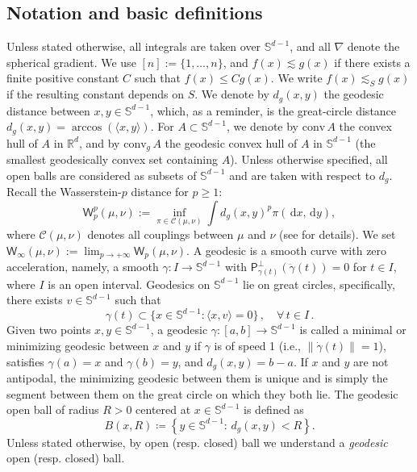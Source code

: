\documentclass[a4paper,11pt]{article}
\theoremstyle{plain}
\newcommand{\proj}{\bm{\mathsf{P}}^\perp}
\newcommand{\diff}{\, \mathrm{d}}
\newcommand{\conv}{\mathrm{conv}}
\renewcommand{\S}{\mathbb{S}^{d-1}}
\renewcommand{\leq}{\leqslant}
\renewcommand{\geq}{\geqslant}
\numberwithin{equation}{section}
\newcommand{\nbbg}[1]{ {\text{\bf bg:} \color{mygrey}{#1}} }
\newcommand{\npdr}[1]{ {\colorbox{MIT}{\color{white} \textsf{PR}} \color{MIT}{#1}} }
\begin{document}
\subsection{Notation and basic definitions} 
Unless stated otherwise, all integrals are taken over $\S$, and all $\nabla$ denote the spherical gradient. We use $[n]:=\{1,\ldots,n\}$, and $f(x) \lesssim g(x)$ if there exists a finite positive constant $C$ such that $f(x) \leq Cg(x)$. We write $f(x) \lesssim_S g(x)$ if the resulting constant depends on $S$. We denote by $d_g(x,y)$ the geodesic distance between $x, y \in \S$, which, as a reminder, is the great-circle distance $d_g(x,y) = \arccos(\langle x, y \rangle)$. For $A \subset \S$, we denote by $\mathrm{conv}\, A$ the convex hull of $A$ in $\mathbb{R}^d$, and by $\conv_g\, A$ the geodesic convex hull of $A$ in $\S$ (the smallest geodesically convex set containing $A$). Unless otherwise specified, all open balls are considered as subsets of $\S$ and are taken with respect to $d_g$. 
Recall the Wasserstein-$p$ distance for $p\geq 1$:
\begin{equation} \label{eq: wass.dist}
    \mathsf{W}_p^p(\mu,\nu):=\inf_{\pi\in \mathcal{C}(\mu,\nu)}\int d_g(x,y)^p\pi(\diff x,\diff y),
\end{equation}
where $\mathcal{C}(\mu,\nu)$ denotes all couplings between $\mu$ and $\nu$ (see \cite{villani2009optimal} for details). 
We set \( \mathsf{W}_\infty(\mu,\nu) := \lim_{p \to +\infty} \mathsf{W}_p(\mu,\nu) \). A geodesic is a smooth curve with zero acceleration, namely, a smooth \( \gamma: I \to \S \) with \( \proj_{\gamma(t)}(\ddot{\gamma}(t)) = 0 \) for \( t \in I \), where \( I \) is an open interval. Geodesics on \( \S \) lie on great circles, specifically, there exists \( v \in \S \) such that
\[
\gamma(t) \subset \{x \in \S : \langle x, v \rangle = 0 \}\,, \quad \forall\, t \in I\,.
\]
Given two points \( x, y \in \S \), a geodesic \( \gamma: [a,b] \to \S \) is called a minimal or minimizing geodesic between \( x \) and \( y \) if \( \gamma \) is of speed 1 (i.e., \( \|\dot{\gamma}(t)\| = 1 \)), satisfies \( \gamma(a) = x \) and \( \gamma(b) = y \), and \( d_g(x,y) = b - a \). If \( x \) and \( y \) are not antipodal, the minimizing geodesic between them is unique and is simply the segment between them on the great circle on which they both lie. The geodesic open ball of radius $R>0$ centered at $x\in\S$ is defined as
\begin{equation} \label{eq: geodesic.ball.def}
    B(x,R)\coloneqq\left\{y\in \S:\, d_g(x,y)< R \right\}.
\end{equation}
Unless stated otherwise, by open (resp. closed) ball we understand a \emph{geodesic} open (resp. closed) ball.
\end{document}
